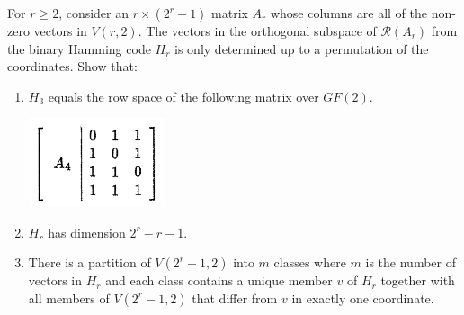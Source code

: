 \prob
{
    For $r \geq 2$, consider an $r\times (2^r -1)$ matrix $A_r$ whose columns are all of the non-zero vectors in
    $V(r,2)$. The vectors in the orthogonal subspace of $\mathcal{R}(A_r)$ from the binary Hamming code $H_r$ is only
    determined up to a permutation of the coordinates. Show that:
    \begin{enumerate}[label=(\roman*)]
        \item $H_3$ equals the row space of the following matrix over $GF(2)$.
                \begin{center}
                    \includegraphics[width=4cm]{Test3/Problem6/matrix.png}
                \end{center}\pn
        \item $H_r$ has dimension $2^r -r - 1$.
        \item There is a partition of $V(2^r - 1, 2)$ into $m$ classes where $m$ is the number of vectors in $H_r$ and
              each class contains a unique member $v$ of $H_r$ together with all members of $V(2^r - 1, 2)$ that differ from $v$ in
              exactly one coordinate.
    \end{enumerate}
}